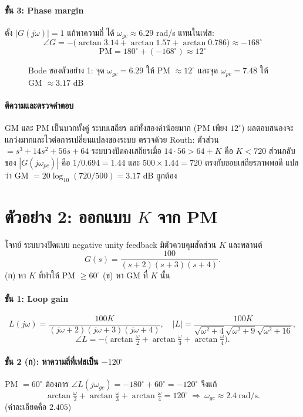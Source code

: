 \documentclass[12pt,a4paper]{article}
\newcommand{\jw}{j\omega}
\newcommand{\atan}{\operatorname{arctan}}
\begin{document}
\paragraph{ขั้น 3: Phase margin}
ตั้ง $|G(\jw)|=1$ แก้หาความถี่ ได้ $\omega_{gc}\approx6.29$ rad/s แทนในเฟส:
\[
\angle G=-\big(\atan 3.14+\atan1.57+\atan0.786\big)\approx-168^\circ
\]
\[
\boxed{\mathrm{PM}=180^\circ+(-168^\circ)\approx12^\circ}
\]

\begin{figure}[h]
\centering

\caption{Bode ของตัวอย่าง 1: จุด $\omega_{gc}=6.29$ ให้ PM $\approx12^\circ$ และจุด $\omega_{pc}=7.48$ ให้ GM $\approx3.17$ dB}
\end{figure}

\paragraph{ตีความและตรวจคำตอบ}
GM และ PM เป็นบวกทั้งคู่ ระบบเสถียร แต่ทั้งสองค่าน้อยมาก (PM เพียง $12^\circ$) ผลตอบสนองจะแกว่งมากและไวต่อการเปลี่ยนแปลงของระบบ ตรวจด้วย Routh: ตัวส่วน $=s^3+14s^2+56s+64$ ระบบวงปิดคงเสถียรเมื่อ $14\cdot56>64+K$ คือ $K<720$ ส่วนกลับของ $|G(j\omega_{pc})|$ คือ $1/0.694=1.44$ และ $500\times1.44=720$ ตรงกับขอบเสถียรภาพพอดี แปลว่า GM $=20\log_{10}(720/500)=3.17$ dB ถูกต้อง

\section{ตัวอย่าง 2: ออกแบบ $K$ จาก PM}
\begin{exbox}{โจทย์}
ระบบวงปิดแบบ negative unity feedback มีตัวควบคุมสัดส่วน $K$ และพลานต์
\[
G(s)=\frac{100}{(s+2)(s+3)(s+4)}.
\]
(ก) หา $K$ ที่ทำให้ PM $\ge60^\circ$ \quad (ข) หา GM ที่ $K$ นั้น
\end{exbox}

\paragraph{ขั้น 1: Loop gain}
\[
L(\jw)=\frac{100K}{(\jw+2)(\jw+3)(\jw+4)},\quad
|L|=\frac{100K}{\sqrt{\omega^2+4}\sqrt{\omega^2+9}\sqrt{\omega^2+16}},
\]
\[
\angle L=-\Big(\atan\tfrac{\omega}{2}+\atan\tfrac{\omega}{3}+\atan\tfrac{\omega}{4}\Big).
\]

\paragraph{ขั้น 2 (ก): หาความถี่ที่เฟสเป็น $-120^\circ$}
PM $=60^\circ$ ต้องการ $\angle L(j\omega_{gc})=-180^\circ+60^\circ=-120^\circ$ จึงแก้
\[
\atan\tfrac{\omega}{2}+\atan\tfrac{\omega}{3}+\atan\tfrac{\omega}{4}=120^\circ
\ \Rightarrow\ \omega_{gc}\approx2.4\ \text{rad/s}.
\]
(ค่าละเอียดคือ $2.405$)
\end{document}
